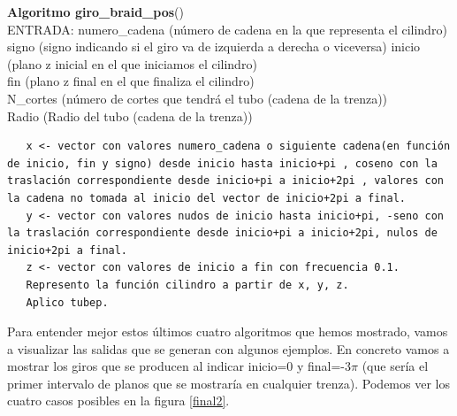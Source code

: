  \newpage
  \begin{alg}
  	\textbf{Algoritmo giro\_braid\_pos}()\\
  	ENTRADA: numero\_cadena (número de cadena en la que representa el cilindro)\\
  	\hspace*{2.2cm} signo (signo indicando si el giro va de izquierda a derecha o viceversa)
  	\hspace*{2.2cm} inicio (plano z inicial en el que iniciamos el cilindro)\\
  	\hspace*{2.2cm} fin (plano z final en el que finaliza el cilindro)\\
  	\hspace*{2.2cm} N\_cortes (número de cortes que tendrá el tubo (cadena de la trenza))\\
  	\hspace*{2.2cm} Radio (Radio del tubo (cadena de la trenza))
  	
\begin{lstlisting}
   x <- vector con valores numero_cadena o siguiente cadena(en función de inicio, fin y signo) desde inicio hasta inicio+pi , coseno con la traslación correspondiente desde inicio+pi a inicio+2pi , valores con la cadena no tomada al inicio del vector de inicio+2pi a final.
   y <- vector con valores nudos de inicio hasta inicio+pi, -seno con la traslación correspondiente desde inicio+pi a inicio+2pi, nulos de inicio+2pi a final.
   z <- vector con valores de inicio a fin con frecuencia 0.1.   
   Represento la función cilindro a partir de x, y, z. 
   Aplico tubep. 
\end{lstlisting}
  \end{alg}
  
  Para entender mejor estos últimos cuatro algoritmos que hemos mostrado, vamos a visualizar las salidas que se generan con algunos ejemplos. En concreto vamos a mostrar los giros que se producen al indicar inicio=0 y final=-3$ \pi $ (que sería el primer intervalo de planos que se mostraría en cualquier trenza). Podemos ver los cuatro casos posibles en la figura \ref{final2}.
  
